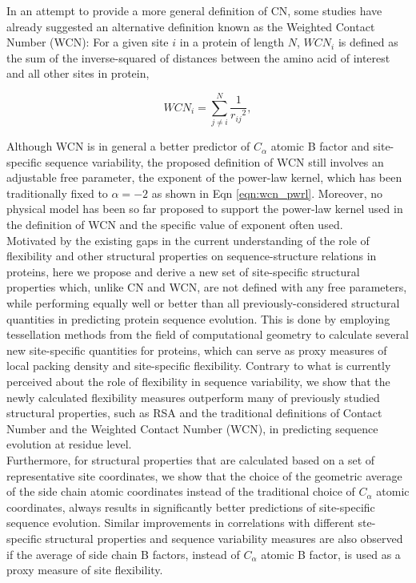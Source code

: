 \documentclass[11pt]{article}
\begin{document}
	In an attempt to provide a more general definition of CN, some studies \citep[e.g.,][]{Lin2008} have already suggested an alternative definition known as the Weighted Contact Number (WCN): For a given site $i$ in a protein of length $N$, $WCN_i$ is defined as the sum of the inverse-squared of distances between the amino acid of interest and all other sites in protein,

        \begin{equation}
            \label{eqn:wcn_pwrl}
            WCN_{i} = \sum^N_{j\neq i} \frac{1}{{r_{ij}}^{2}},
        \end{equation}

	Although WCN is in general a better predictor of $C_\alpha$ atomic B factor and site-specific sequence variability, the proposed definition of WCN still involves an adjustable free parameter, the exponent of the power-law kernel, which has been traditionally fixed to $\alpha=-2$ as shown in Eqn \ref{eqn:wcn_pwrl}. Moreover, no physical model has been so far proposed to support the power-law kernel used in the definition of WCN and the specific value of exponent often used. \\
        
    Motivated by the existing gaps in the current understanding of the role of flexibility and other structural properties on sequence-structure relations in proteins, here we propose and derive a new set of site-specific structural properties which, unlike CN and WCN, are not defined with any free parameters, while performing equally well or better than all previously-considered structural quantities in predicting protein sequence evolution. This is done by employing tessellation methods from the field of computational geometry to calculate several new site-specific quantities for proteins, which can serve as proxy measures of local packing density and site-specific flexibility. Contrary to what is currently perceived about the role of flexibility in sequence variability, we show that the newly calculated flexibility measures outperform many of previously studied structural properties, such as RSA and the traditional definitions of Contact Number and the Weighted Contact Number (WCN), in predicting sequence evolution at residue level. \\
    
    Furthermore, for structural properties that are calculated based on a set of representative site coordinates,  we show that the choice of the geometric average of the side chain atomic coordinates instead of the traditional choice of $C_\alpha$ atomic coordinates, always results in significantly better predictions of site-specific sequence evolution. Similar improvements in correlations with different ste-specific structural properties and sequence variability measures are also observed if the average of side chain B factors, instead of $C_\alpha$ atomic B factor, is used as a proxy measure of site flexibility.
    
\end{document}
